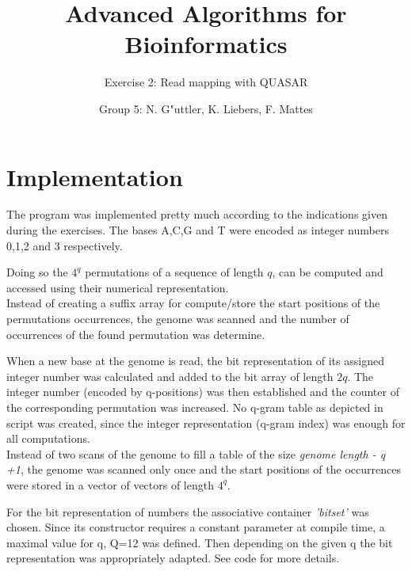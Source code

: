 \documentclass[11pt, notitlepage]{scrartcl}
\begin{document}
         


\title{Advanced Algorithms for Bioinformatics} 
\subtitle{Exercise 2: Read mapping with QUASAR}
\author{Group 5: N. G"uttler, K. Liebers, F. Mattes} %
\maketitle

\section{Implementation}
The program was implemented pretty much according to the indications given during the exercises. The bases A,C,G and T were encoded as integer numbers 0,1,2 and 3 respectively.

Doing so the $4^q$ permutations of a sequence of length $q$, can be computed and accessed using their numerical representation.\\ 
Instead of creating a suffix array for compute/store the start positions of the permutations occurrences, the genome was scanned and the number of occurrences of the found permutation was determine.

When a new base at the genome is read, the bit representation of  its assigned integer number was calculated and added to the bit array of length $2q$. The integer number (encoded by q-positions) was then established and the counter of the corresponding permutation was increased. 
No q-gram table as depicted in script was created, since the integer representation (q-gram index) was enough for all computations.\\ 
Instead of two scans of the genome to fill a table of the size \textit{genome length - q +1}, the genome was scanned only once and the start positions of the occurrences were stored in a vector of vectors of length $4^q$.

For the bit representation of numbers the associative container \textit{'bitset'} was chosen. Since its constructor requires a constant parameter at compile time, a maximal value for q, Q=12 was defined. Then depending on the given q the bit representation was appropriately adapted. 
See code for more details.   
\end{document}
